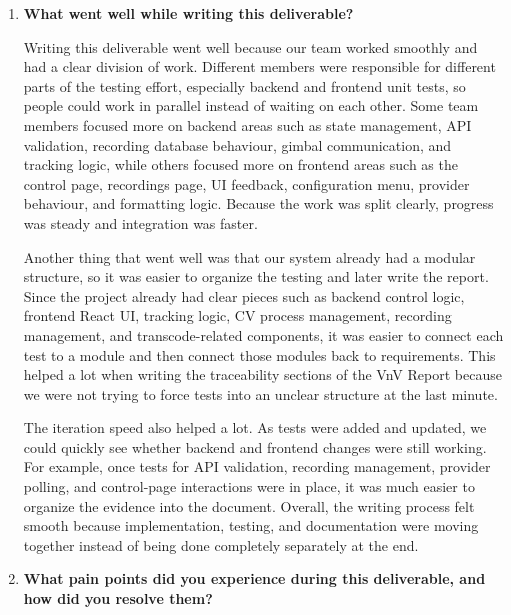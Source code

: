 \documentclass[12pt, titlepage]{article}
\begin{document}
\begin{enumerate}
  \item \textbf{What went well while writing this deliverable?}

        Writing this deliverable went well because our team worked smoothly and had a
        clear division of work. Different members were responsible for different parts
        of the testing effort, especially backend and frontend unit tests, so people
        could work in parallel instead of waiting on each other. Some team members
        focused more on backend areas such as state management, API validation,
        recording database behaviour, gimbal communication, and tracking logic, while
        others focused more on frontend areas such as the control page, recordings
        page, UI feedback, configuration menu, provider behaviour, and formatting
        logic. Because the work was split clearly, progress was steady and integration
        was faster.

        Another thing that went well was that our system already had a modular
        structure, so it was easier to organize the testing and later write the report.
        Since the project already had clear pieces such as backend control logic,
        frontend React UI, tracking logic, CV process management, recording management,
        and transcode-related components, it was easier to connect each test to a
        module and then connect those modules back to requirements. This helped a lot
        when writing the traceability sections of the VnV Report because we were not
        trying to force tests into an unclear structure at the last minute.

        The iteration speed also helped a lot. As tests were added and updated, we
        could quickly see whether backend and frontend changes were still working. For
        example, once tests for API validation, recording management, provider polling,
        and control-page interactions were in place, it was much easier to organize the
        evidence into the document. Overall, the writing process felt smooth because
        implementation, testing, and documentation were moving together instead of
        being done completely separately at the end.

  \item \textbf{What pain points did you experience during this deliverable, and how did you
          resolve them?}


\end{enumerate}
\end{document}
